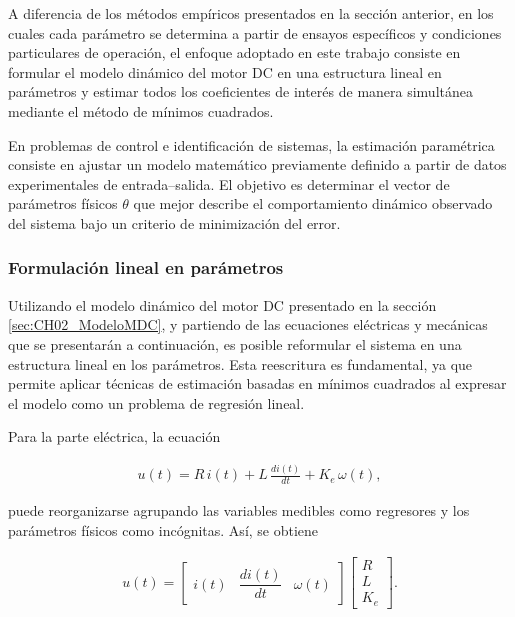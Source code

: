     A diferencia de los métodos empíricos presentados en la sección anterior, en los cuales cada parámetro se determina a partir de ensayos específicos y condiciones particulares de operación, el enfoque adoptado en este trabajo consiste en formular el modelo dinámico del motor \ac{DC} en una estructura lineal en parámetros y estimar todos los coeficientes de interés de manera simultánea mediante el método de mínimos cuadrados. 
    
    En problemas de control e identificación de sistemas, la estimación paramétrica consiste en ajustar un modelo matemático previamente definido a partir de datos experimentales de entrada–salida. El objetivo es determinar el vector de parámetros físicos $\theta$ que mejor describe el comportamiento dinámico observado del sistema bajo un criterio de minimización del error.
    
    \subsubsection*{Formulación lineal en parámetros}
    
    Utilizando el modelo dinámico del motor \ac{DC} presentado en la sección 
\ref{sec:CH02_ModeloMDC}, y partiendo de las ecuaciones eléctricas y mecánicas 
 que se presentarán a continuación, es posible reformular el sistema en una estructura lineal en los parámetros. Esta reescritura es fundamental, ya que permite aplicar técnicas de estimación basadas en mínimos cuadrados al expresar el modelo como un problema de regresión lineal.

Para la parte eléctrica, la ecuación

\begin{align*}
    u(t) = R\,i(t) + L\,\frac{di(t)}{dt} + K_e\,\omega(t),
\end{align*}

puede reorganizarse agrupando las variables medibles como regresores y los 
parámetros físicos como incógnitas. Así, se obtiene

\begin{align*}
    u(t) =  \begin{bmatrix}
    i(t) & \dfrac{di(t)}{dt} & \omega(t)
    \end{bmatrix}
    \begin{bmatrix}
    R \\ L \\ K_e
    \end{bmatrix}.
\end{align*}

